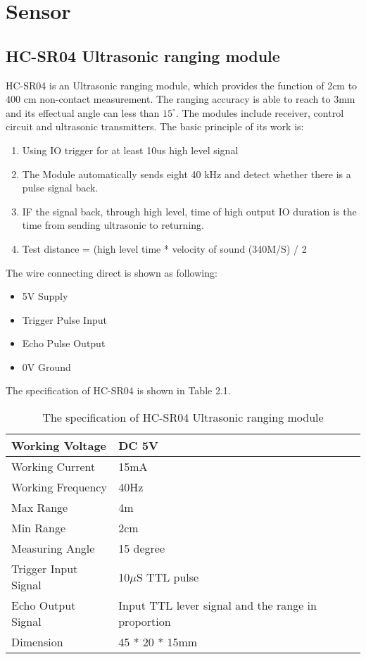 \documentclass[11pt,times,oneside,openright,hardcopy]{eeereport}
\begin{document}
\section{Sensor}
\subsection{HC-SR04 Ultrasonic ranging module}
HC-SR04 is an Ultrasonic ranging module, which provides the function of 2cm to 400 cm non-contact measurement.
The ranging accuracy is able to reach to 3mm and its effectual angle can less than $15^{\circ}$. The modules include receiver, control circuit
and ultrasonic transmitters. The basic principle of its work is:
\begin{enumerate}
    \item Using IO trigger for at least 10us high level signal 
    \item The Module automatically sends eight 40 kHz and detect whether there is a pulse signal back.
    \item IF the signal back, through high level, time of high output IO duration is the time from sending ultrasonic to returning.
    \item \begin{center}Test distance = (high level time * velocity of sound (340M/S) / 2\end{center}
\end{enumerate}

The wire connecting direct is shown as following:
\begin{itemize}
    \item 5V Supply
    \item Trigger Pulse Input
    \item Echo Pulse Output
    \item 0V Ground
\end{itemize}

The specification of HC-SR04 is shown in Table 2.1.
\begin{table}[h]
\label{tab:tab1}
\centering
\caption{The specification of HC-SR04 Ultrasonic ranging module}
\renewcommand{\arraystretch}{2}
\setlength{\tabcolsep}{10pt}
\begin{tabular}{ | m{6cm} | m{6cm} | } 
\hline Working Voltage & DC 5V \\ 
\hline Working Current & 15mA \\
\hline Working Frequency & 40Hz \\
\hline Max Range & 4m \\
\hline Min Range & 2cm \\
\hline Measuring Angle & 15 degree \\
\hline Trigger Input Signal & 10$\mu$S TTL pulse \\
\hline Echo Output Signal & Input TTL lever signal and the range in proportion \\
\hline Dimension & 45 * 20 * 15mm \\
\hline 
\end{tabular} 
\end{table}
\end{document}
